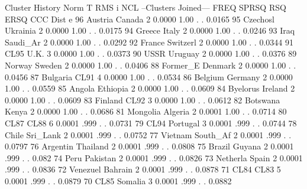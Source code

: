 \documentclass{article}
\begin{document}
\begin{Woutput}
                                     Cluster History
                                                                                Norm    T
                                                                                 RMS    i
   NCL    --Clusters Joined---      FREQ     SPRSQ     RSQ    ERSQ     CCC      Dist    e
    96    Austria     Canada           2    0.0000    1.00    .        .      0.0165
    95    Czechosl    Ukrainia         2    0.0000    1.00    .        .      0.0175
    94    Greece      Italy            2    0.0000    1.00    .        .      0.0246
    93    Iraq        Saudi_Ar         2    0.0000    1.00    .        .      0.0292
    92    France      Switzerl         2    0.0000    1.00    .        .      0.0344
    91    CL95        U.K.             3    0.0000    1.00    .        .      0.0373
    90    USSR        Uruguay          2    0.0000    1.00    .        .      0.0376
    89    Norway      Sweden           2    0.0000    1.00    .        .      0.0406
    88    Former_E    Denmark          2    0.0000    1.00    .        .      0.0456
    87    Bulgaria    CL91             4    0.0000    1.00    .        .      0.0534
    86    Belgium     Germany          2    0.0000    1.00    .        .      0.0559
    85    Angola      Ethiopia         2    0.0000    1.00    .        .      0.0609
    84    Byelorus    Ireland          2    0.0000    1.00    .        .      0.0609
    83    Finland     CL92             3    0.0000    1.00    .        .      0.0612
    82    Botswana    Kenya            2    0.0000    1.00    .        .      0.0686
    81    Mongolia    Algeria          2    0.0001    1.00    .        .      0.0714
    80    CL87        CL88             6    0.0001    .999    .        .      0.0731
    79    CL94        Portugal         3    0.0001    .999    .        .      0.0744
    78    Chile       Sri_Lank         2    0.0001    .999    .        .      0.0752
    77    Vietnam     South_Af         2    0.0001    .999    .        .      0.0797
    76    Argentin    Thailand         2    0.0001    .999    .        .      0.0808
    75    Brazil      Guyana           2    0.0001    .999    .        .       0.082
    74    Peru        Pakistan         2    0.0001    .999    .        .      0.0826
    73    Netherla    Spain            2    0.0001    .999    .        .      0.0836
    72    Venezuel    Bahrain          2    0.0001    .999    .        .      0.0878
    71    CL84        CL83             5    0.0001    .999    .        .      0.0879
    70    CL85        Somalia          3    0.0001    .999    .        .      0.0882

\end{Woutput}
\end{document}

